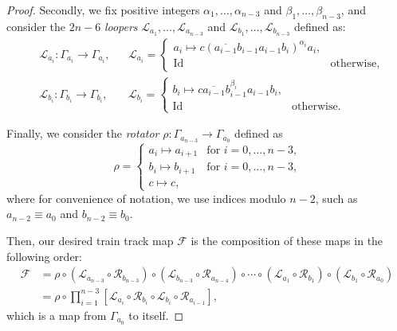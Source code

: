 \documentclass[11pt, letterpaper]{amsart}
\theoremstyle{plain}
\theoremstyle{definition}
\newcommand{\G}{\Gamma}
\newcommand{\cL}{\mathcal{L}}
\newcommand{\cR}{\mathcal{R}}
\newcommand{\calF}{\mathcal{F}}
\newcommand{\ov}[1]{\overline{#1}}
\begin{document}
\begin{proof}
Secondly, we fix positive integers $\alpha_1,\ldots,\alpha_{n-3}$ and
$\beta_{1},\ldots,\beta_{n-3}$, and consider the $2n-6$ \emph{loopers} $\cL_{a_1},\ldots,\cL_{a_{n-3}}$ and $\cL_{b_1},\ldots,\cL_{b_{n-3}}$ defined as:
\begin{align*}
    &\cL_{a_i}: \G_{a_i} \to \G_{a_i},
    &&\cL_{a_i} =
    \begin{cases}
        a_i \mapsto c(\ov{a_{i-1}}b_{i-1}a_{i-1}b_i)^{\alpha_{i}}a_i, \\
    \text{Id} & \text{otherwise},
    \end{cases}\\
    &\cL_{b_i}: \G_{b_i} \to \G_{b_i},
    &&\cL_{b_i} =
    \begin{cases}
        b_i \mapsto c\overline{a_{i-1}}b_{i-1}^{\beta_i}a_{i-1}b_i, \\
        \text{Id} & \text{otherwise}.
    \end{cases}
\end{align*}

Finally, we consider the \emph{rotator} $\rho: \G_{a_{n-3}} \to \G_{a_0}$ defined as 
\[
    \rho =
    \begin{cases}
        a_i \mapsto a_{i+1} & \text{for $i=0,\ldots,n-3$,}\\
        b_i \mapsto b_{i+1} & \text{for $i=0,\ldots,n-3$,}\\
        c \mapsto c,
    \end{cases} 
  \]
  where for convenience of notation, we use indices modulo $n-2$, such as $a_{n-2} \equiv a_0$ and $b_{n-2} \equiv b_0$.
  
  
Then, our desired train track map $\calF$ is the composition of these maps in the following order:
    \begin{align*}
        \calF&= \rho \circ (\cL_{a_{n-3}} \circ \cR_{b_{n-3}})\circ (\cL_{b_{n-3}} \circ \cR_{a_{n-4}}) \circ \cdots \circ (\cL_{a_1} \circ \cR_{b_1}) \circ (\cL_{b_1} \circ \cR_{a_0})\\
        &= \rho \circ \prod_{i=1}^{n-3}[\cL_{a_{i}} \circ \cR_{b_i} \circ \cL_{b_i} \circ \cR_{a_{i-1}}],
    \end{align*}
    which is a map from $\G_{a_0}$ to itself.


\end{proof}
\end{document}
